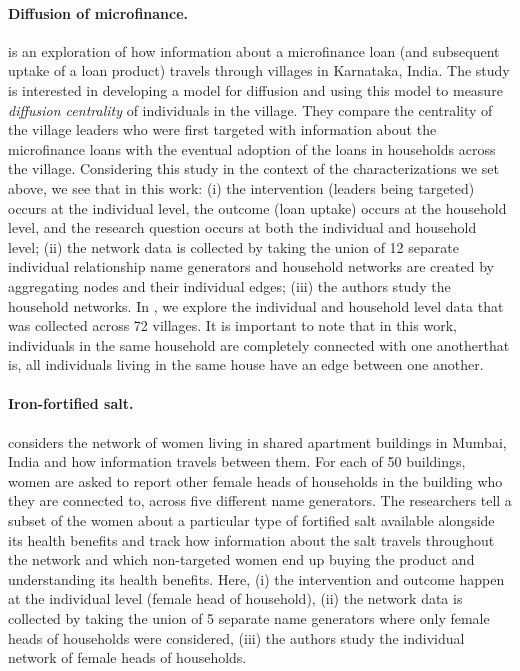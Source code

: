 \paragraph{Diffusion of microfinance.} \cite{banerjee2013} is an exploration of how information about a microfinance loan (and subsequent uptake of a loan product) travels through villages in Karnataka, India. The study is interested in developing a model for diffusion and using this model to measure \textit{diffusion centrality} of individuals in the village. They compare the centrality of the village leaders who were first targeted with information about the microfinance loans with the eventual adoption of the loans in households across the village. Considering this study in the context of the characterizations we set above, we see that in this work: (i) the intervention (leaders being targeted) occurs at the individual level, the outcome (loan uptake) occurs at the household level, and the research question occurs at both the individual and household level; (ii) the network data is collected by taking the union of 12 separate individual relationship name generators and household networks are created by aggregating nodes and their individual edges; (iii) the authors study the household networks. In , we explore the individual and household level data that was collected across 72 villages. It is important to note that in this work, individuals in the same household are completely connected with one another\textemdash that is, all individuals living in the same house have an edge between one another. 

\paragraph{Iron-fortified salt.} \cite{alexander2022algorithms} considers the network of women living in shared apartment buildings in Mumbai, India and how information travels between them. For each of 50 buildings, women are asked to report other female heads of households in the building who they are connected to, across five different name generators. The researchers tell a subset of the women about a particular type of fortified salt available alongside its health benefits and track how information about the salt travels throughout the network and which non-targeted women end up buying the product and understanding its health benefits. Here, (i) the intervention and outcome happen at the individual level (female head of household), (ii) the network data is collected by taking the union of 5 separate name generators where only female heads of households were considered, (iii) the authors study the individual network of female heads of households. 

